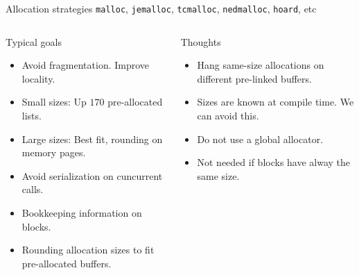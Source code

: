 \documentclass[10pt,aspectratio=169]{beamer}
\begin{document}
\begin{frame}{Allocation strategies}
{\texttt{malloc}, \texttt{jemalloc}, \texttt{tcmalloc},
\texttt{nedmalloc}, \texttt{hoard}, etc}
\begin{columns}
\begin{column}{0.5\textwidth}
Typical goals
\begin{itemize}
\item<alert@1> Avoid fragmentation. Improve locality.
\item<alert@2> Small sizes: Up $170$ pre-allocated lists.
\item<alert@3> Large sizes: Best fit, rounding on memory pages.
\item<alert@4> Avoid serialization on cuncurrent calls.
\item<alert@5> Bookkeeping information on blocks.
\item<alert@2> Rounding allocation sizes to fit pre-allocated buffers.
\end{itemize}

\end{column}

\begin{column}{0.5\textwidth}
Thoughts
\begin{itemize}
\item<alert@1> Hang same-size allocations on different pre-linked buffers.
\item<alert@2> Sizes are known at compile time. We can avoid this.
\item<alert@3> Do not use a global allocator.
\item<alert@4> Not needed if blocks have alway the same size.
\end{itemize}

\end{column}
\end{columns}
\end{frame}
\end{document}
